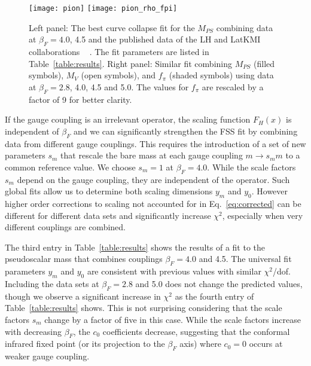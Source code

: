 \documentclass[aps,prl,twocolumn,]{revtex4-1}  %
\newcommand{\eq}[1]{Eq.~\ref{#1}}
\begin{document}

\begin{figure}[tbp]
\centering
  \texttt{[image: pion]}\hfill
  \texttt{[image: pion\_rho\_fpi]}
  \caption{\label{fig:fss_combined} Left panel: The best curve collapse fit for the $M_{PS}$ combining  data at $\beta_F=4.0$, 4.5 and the published data of the LH and LatKMI collaborations ~\protect\cite{Fodor:2011tu,Aoki:2012eq} . The fit parameters are listed in Table~\protect\ref{table:results}. Right panel: Similar fit combining $M_{PS}$ (filled symbols), $M_V$ (open symbols), and $f_\pi$ (shaded symbols) using data at $\beta_F=2.8$, 4.0, 4.5 and 5.0.  The values for $f_\pi$ are rescaled by a factor of 9 for better clarity.}
\end{figure}

If the gauge coupling is an irrelevant operator, the scaling function $F_H(x)$ is independent of $\beta_F$ and
we can significantly strengthen  the FSS fit   by combining data from different gauge couplings. This requires the introduction of a set of new parameters  $s_m$ that rescale the bare mass at each gauge coupling  $m \to s_m m$ to a common reference value. We choose $s_m=1$ at $\beta_F=4.0$. While the scale factors $s_m$ depend on the gauge coupling, they are independent of the operator. 
Such  global fits allow us to determine both  scaling dimensions  $y_m$ and $y_0$. However higher order corrections to scaling not accounted for in \eq{eq:corrected} can be different for different data sets and  significantly increase  $\chi^2$, especially when very different couplings are combined. 

The third entry in Table~\ref{table:results} shows the results of a fit to the pseudoscalar mass that combines couplings $\beta_F=4.0$ and 4.5. The universal fit parameters $y_m$ and $y_0$ are consistent with previous values with similar  $\chi^2$/dof. Including  the data sets at $\beta_F=2.8$ and 5.0 does not change the predicted values,  though we observe a significant increase in $\chi^2$ as the fourth entry of Table~\ref{table:results}  shows. This is not  surprising considering that the scale factors $s_m$ change by a factor of five in this case. While the  scale factors  increase with decreasing $\beta_F$,  the $c_0$ coefficients decrease, suggesting that the conformal infrared fixed point (or its projection to the $\beta_F$ axis) where $c_0 = 0$ occurs at weaker gauge coupling. 
\end{document}
